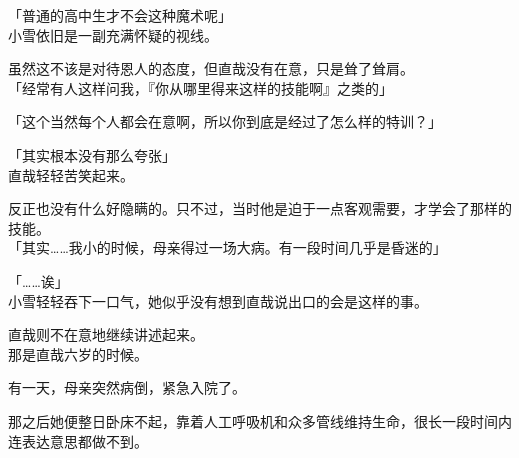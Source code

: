 「普通的高中生才不会这种魔术呢」\\

小雪依旧是一副充满怀疑的视线。

虽然这不该是对待恩人的态度，但直哉没有在意，只是耸了耸肩。\\

「经常有人这样问我，『你从哪里得来这样的技能啊』之类的」

「这个当然每个人都会在意啊，所以你到底是经过了怎么样的特训？」

「其实根本没有那么夸张」\\

直哉轻轻苦笑起来。

反正也没有什么好隐瞒的。只不过，当时他是迫于一点客观需要，才学会了那样的技能。\\

「其实……我小的时候，母亲得过一场大病。有一段时间几乎是昏迷的」

「……诶」\\

小雪轻轻吞下一口气，她似乎没有想到直哉说出口的会是这样的事。

直哉则不在意地继续讲述起来。\\

那是直哉六岁的时候。

有一天，母亲突然病倒，紧急入院了。

那之后她便整日卧床不起，靠着人工呼吸机和众多管线维持生命，很长一段时间内连表达意思都做不到。\\

